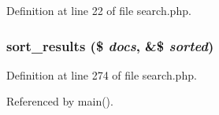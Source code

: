 Definition at line 22 of file search.php.\hypertarget{search_8php_4d779e04b0b0d65648e829919359fdf8}{
\subsubsection[sort\_\-results]{\setlength{\rightskip}{0pt plus 5cm}sort\_\-results (\$ {\em docs}, \&\$ {\em sorted})}}
\label{search_8php_4d779e04b0b0d65648e829919359fdf8}




Definition at line 274 of file search.php.

Referenced by main().